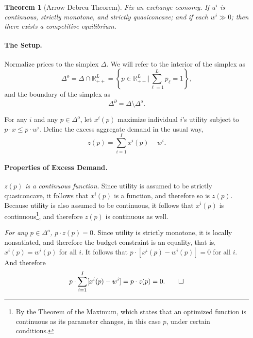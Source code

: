 \documentclass[12pt]{article}
\newcommand{\R}{\mathbb{R}}
\newcommand{\sumi}{\sum_{i=1}^I}
\newtheorem*{theorem*}{Theorem}
\theoremstyle{definition}
\begin{document}
\maketitle
\onehalfspace




\begin{theorem*}[Arrow-Debreu Theorem]
	Fix an exchange economy. If $u^i$ is continuous, strictly monotone, and strictly quasiconcave; and if each $w^i \gg 0$; then there exists a competitive equilibrium.
\end{theorem*}


\paragraph*{The Setup.}

Normalize prices to the simplex $\Delta$. We will refer to the interior of the simplex as 
	\[\Delta^o = \Delta \cap \R^L_{++} = \left \{ p \in \R^L_{++} \Bigg\vert \sum_{\ell=1}^L p_{\ell} =1 \right \},	\]	
and the boundary of the simplex as
	\[\Delta^{\partial}  = \Delta \setminus \Delta^o.	\]

For any $i$ and any $p \in \Delta^o$, let $x^i(p)$ maximize individual $i$'s utility subject to $p \cdot x \leq p \cdot w^i$. Define the excess aggregate demand in the usual way,
	\[z(p)=\sumi 	x^i(p) - w^i.\]
	


\paragraph{Properties of Excess Demand.}

\begin{claim}
	\emph{$z(p)$ is a continuous function.} Since utility is assumed to be strictly quasiconcave, it follows that $x^i(p)$ is a function, and therefore so is $z(p)$. Because utility is also assumed to be continuous, it follows that $x^i(p)$ is continuous\footnote{By the Theorem of the Maximum, which states that an optimized function is continuous as its parameter changes, in this case $p$, under certain conditions.}, and therefore $z(p)$ is continuous as well. 
\end{claim}

\begin{claim}
	\emph{For any $p \in \Delta^o$, $p\cdot z(p)=0$.} Since utility is strictly monotone, it is locally nonsatiated, and therefore the budget constraint is an equality, that is, $x^i(p)=w^i(p)$ for all $i$. It follows that $p \cdot [x^i(p) - w^i(p)]=0$ for all $i$. And therefore
		\[p \cdot \sumi [x^i(p) - w^i ]= p \cdot z(p) = 0.	\qedhere \]
\end{claim}
\end{document}
